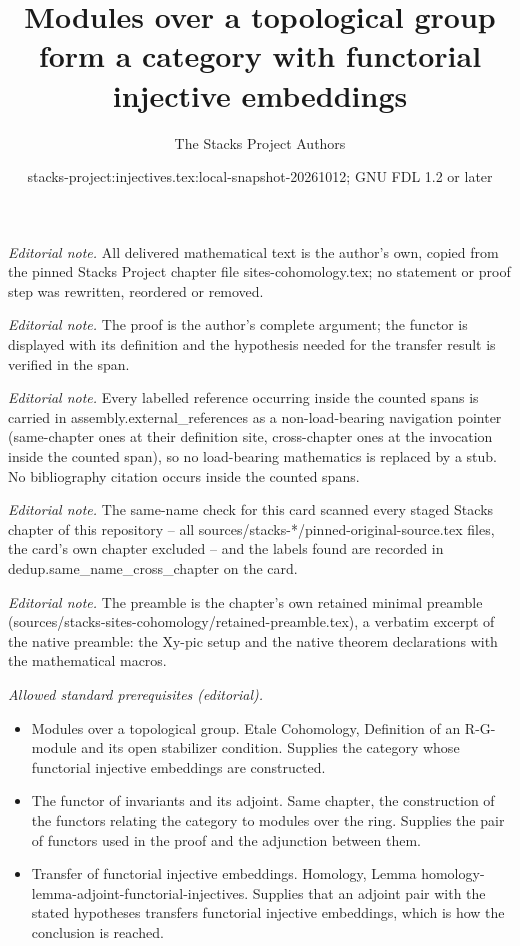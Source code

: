 \documentclass[10pt,a4paper]{amsart}
\title{Modules over a topological group form a category with functorial injective embeddings}
\author{The Stacks Project Authors}
\date{stacks-project:injectives.tex:local-snapshot-20261012; GNU FDL 1.2 or later}
\theoremstyle{plain}
\theoremstyle{definition}
\theoremstyle{remark}
\numberwithin{equation}{subsection}
\begin{document}
\maketitle
\noindent\textit{Editorial note.} All delivered mathematical text is the author's own, copied from the pinned Stacks Project chapter file sites-cohomology.tex; no statement or proof step was rewritten, reordered or removed.\par\medskip
\noindent\textit{Editorial note.} The proof is the author's complete argument; the functor is displayed with its definition and the hypothesis needed for the transfer result is verified in the span.\par\medskip
\noindent\textit{Editorial note.} Every labelled reference occurring inside the counted spans is carried in assembly.external\_references as a non-load-bearing navigation pointer (same-chapter ones at their definition site, cross-chapter ones at the invocation inside the counted span), so no load-bearing mathematics is replaced by a stub. No bibliography citation occurs inside the counted spans.\par\medskip
\noindent\textit{Editorial note.} The same-name check for this card scanned every staged Stacks chapter of this repository -- all sources/stacks-*/pinned-original-source.tex files, the card's own chapter excluded -- and the labels found are recorded in dedup.same\_name\_cross\_chapter on the card.\par\medskip
\noindent\textit{Editorial note.} The preamble is the chapter's own retained minimal preamble (sources/stacks-sites-cohomology/retained-preamble.tex), a verbatim excerpt of the native preamble: the Xy-pic setup and the native theorem declarations with the mathematical macros.\par\medskip
\noindent\textit{Allowed standard prerequisites (editorial).}\begin{itemize}
\item Modules over a topological group. Etale Cohomology, Definition of an R-G-module and its open stabilizer condition. Supplies the category whose functorial injective embeddings are constructed.
\item The functor of invariants and its adjoint. Same chapter, the construction of the functors relating the category to modules over the ring. Supplies the pair of functors used in the proof and the adjunction between them.
\item Transfer of functorial injective embeddings. Homology, Lemma homology-lemma-adjoint-functorial-injectives. Supplies that an adjoint pair with the stated hypotheses transfers functorial injective embeddings, which is how the conclusion is reached.
\end{itemize}\medskip
\end{document}
